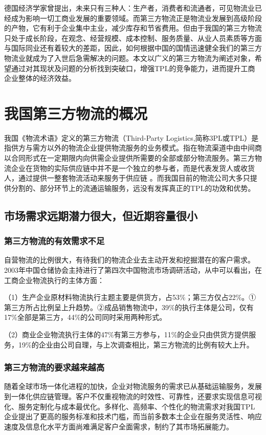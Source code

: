 \documentclass[UTF-8]{CUFEpaper}
\begin{document}
德国经济学家曾提出，未来只有三种人：生产者，消费者和流通者，可见物流业已经成为影响一切工商业发展的重要领域。而第三方物流正是物流业发展到高级阶段的产物，它有利于企业集中主业，减少库存和节省费用。但由于我国的第三方物流只处于成长阶段，在观念、经营规模、成本控制、服务质量、从业人员素质等方面与国际同业还有着较大的差距，因此，如何根据中国的国情迅速健全我们的第三方物流业就成为了入世后急需解决的问题。本文以广义的第三方物流为阐述对象，希望通过对其现状及问题的分析找到突破口，增强TPL的竞争能力，进而提升工商企业整体的经济效益。

\section{我国第三方物流的概况}
我国《物流术语》定义的第三方物流（Third-Party Logistics,简称3PL或TPL）是指供方与需方以外的物流企业提供物流服务的业务模式。指在物流渠道中由中间商以合同形式在一定期限内向供需企业提供所需要的全部或部分物流服务。第三方物流企业在货物的实际供应链中并不是一个独立的参与者，而是代表发货人或收货人，通过提供一整套物流活动来服务于供应链 。而我国目前的物流公司大多只提供分割的、部分环节上的流通运输服务，远没有发挥真正的TPL的功效和优势。

\subsection{市场需求远期潜力很大，但近期容量很小}
\subsubsection{第三方物流的有效需求不足}

自营物流的比例很大，有待我们的物流企业去主动开发和挖掘潜在的客户需求。2003年中国仓储协会主持进行了第四次中国物流市场调研活动，从中可以看出，在工商企业物流执行的主体方面：

（1）生产企业原材料物流执行主题主要是供货方，占53\%；第三方仅占22\%。①第三方所占比例呈上升趋势。②成品销售物流中，39\%的执行主体是公司，仅有17\%全部是第三方，44\%的公司同时采用两种形式。

（2）商业企业物流执行主体的47\%有第三方参与，11\%的企业只由供货方提供服务，19\%的企业由公司自理，与上次调查相比，第三方物流的比例有较大上升。

\subsubsection{第三方物流的要求越来越高}
随着全球市场一体化进程的加快，企业对物流服务的需求已从基础运输服务，发展到一体化供应链管理。客户不仅重视物流的时效性、可靠性，还要求实现信息可视化、服务定制化与成本最优化。多样化、高频率、个性化的物流需求对我国TPL企业提出了更高的服务标准和技术门槛，而当前多数本土企业在服务灵活性、响应速度及信息化水平方面尚难满足客户全面需求，制约了其市场拓展能力。
\end{document}
